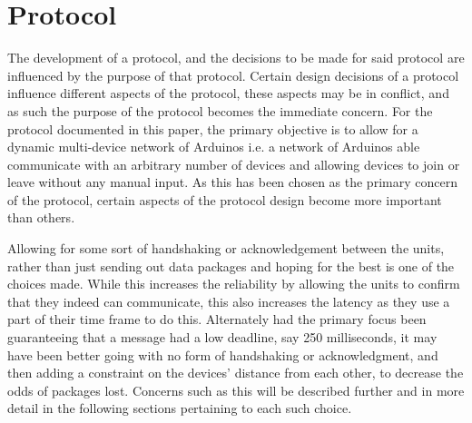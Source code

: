 \section{Protocol}
The development of a protocol, and the decisions to be made for said protocol are influenced by the purpose of that protocol.
Certain design decisions of a protocol influence different aspects of the protocol, these aspects may be in conflict, and as such the purpose of the protocol becomes the immediate concern.
For the protocol documented in this paper, the primary objective is to allow for a dynamic multi-device network of Arduinos i.e. a network of Arduinos able communicate with an arbitrary number of devices and allowing devices to join or leave without any manual input.
As this has been chosen as the primary concern of the protocol, certain aspects of the protocol design become more important than others.

\bigskip \noindent
Allowing for some sort of handshaking or acknowledgement between the units, rather than just sending out data packages and hoping for the best is one of the choices made.
While this increases the reliability by allowing the units to confirm that they indeed can communicate, this also increases the latency as they use a part of their time frame to do this.
Alternately had the primary focus been guaranteeing that a message had a low deadline, say 250 milliseconds, it may have been better going with no form of handshaking or acknowledgment, and then adding a constraint on the devices' distance from each other, to decrease the odds of packages lost.
Concerns such as this will be described further and in more detail in the following sections pertaining to each such choice.